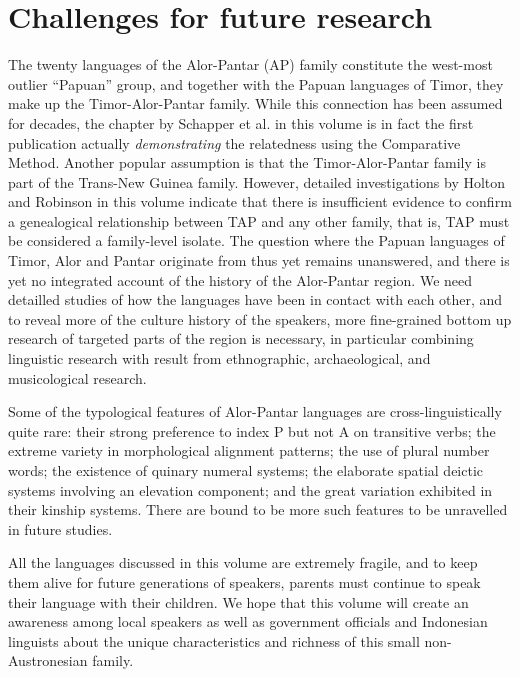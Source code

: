 {\section{Challenges for future research}\label{sec:1:7}

The twenty languages of the Alor-Pantar (AP) family constitute the west-most outlier ``Papuan'' group, and together with the Papuan languages of Timor, they make up the Timor-Alor-Pantar family. While this connection has been assumed for decades, the chapter by Schapper et al. in this volume is in fact the first publication actually \textit{demonstrating} the relatedness using the Comparative Method. Another popular assumption is that the Timor-Alor-Pantar family is part of the Trans-New Guinea family. However, detailed investigations by Holton and Robinson in this volume indicate that there is insufficient evidence to confirm a genealogical relationship between TAP and any other family, that is, TAP must be considered a family-level isolate. The question where the Papuan languages of Timor, Alor and Pantar originate from thus yet remains unanswered, and there is yet no integrated account of the history of the Alor-Pantar region. We need detailled studies of how the languages have been in contact with each other, and to reveal more of the culture history of the speakers, more fine-grained bottom up research of targeted parts of the region is necessary, in particular combining linguistic research with result from ethnographic, archaeological, and musicological research. 

Some of the typological features of Alor-Pantar languages are cross-linguistically quite rare: their strong preference to index P but not A on transitive verbs; the extreme variety in morphological alignment patterns; the use of plural number words; the existence of quinary numeral systems; the elaborate spatial deictic systems involving an elevation component; and the great variation exhibited in their kinship systems. There are bound to be more such features to be unravelled in future studies.

All the languages discussed in this volume are extremely fragile, and to keep them alive for future generations of speakers, parents must continue to speak their language with their children. We hope that this volume will create an awareness among local speakers as well as government officials and Indonesian linguists about the unique characteristics and richness of this small non-Austronesian family.

}
